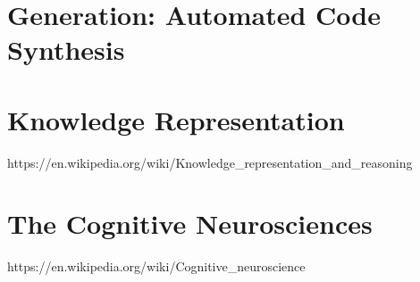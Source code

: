 \section{Generation: Automated Code Synthesis}      %


\section{Knowledge Representation} https://en.wikipedia.org/wiki/Knowledge_representation_and_reasoning ~\cite{Brachmanetal2004}
\section{The Cognitive Neurosciences} https://en.wikipedia.org/wiki/Cognitive_neuroscience ~\cite{Gazzaniga2009}


